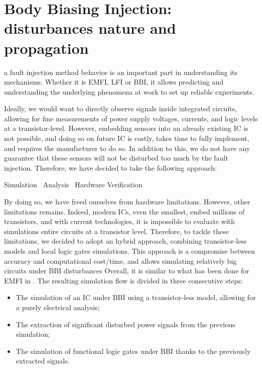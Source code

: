 
\section{Body Biasing Injection: disturbances nature and propagation}
 a fault injection method behavior is an important part in understanding its mechanisms.
Whether it is EMFI, LFI or BBI, it allows predicting and understanding the underlying phenomena at work to set up reliable experiments.

Ideally, we would want to directly observe signals inside integrated circuits, allowing for fine measurements of power supply voltages, currents, and logic levels at a transistor-level.
However, embedding sensors into an already existing IC is not possible, and doing so on future IC is costly, takes time to fully implement, and requires the manufacturer to do so.
In addition to this, we do not have any guarantee that these sensors will not be disturbed too much by the fault injection.
Therefore, we have decided to take the following approach:
\begin{center}
	Simulation \textrightarrow\ Analysis \textrightarrow\ Hardware Verification
\end{center}

By doing so, we have freed ourselves from hardware limitations.
However, other limitations remains.
Indeed, modern ICs, even the smallest, embed millions of transistors, and with current technologies, it is impossible to evaluate with simulations entire circuits at a transistor level.
Therefore, to tackle these limitations, we decided to adopt an hybrid approach, combining transistor-less models and local logic gates simulations.
This approach is a compromise between accuracy and computational cost/time, and allows simulating relatively big circuits under BBI disturbances
Overall, it is similar to what has been done for EMFI in \cite{mathieuEMFI}.
The resulting simulation flow is divided in three consecutive steps:
\begin{itemize}
	\item The simulation of an IC under BBI using a transistor-less model, allowing for a purely electrical analysis;
	\item The extraction of significant disturbed power signals from the previous simulation;
	\item The simulation of functional logic gates under BBI thanks to the previously extracted signals.
\end{itemize}

